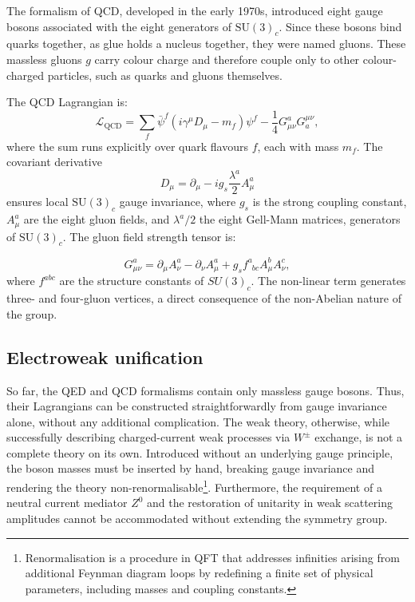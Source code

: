 \vspace{0.5 cm}

The formalism of QCD, developed in the early 1970s, introduced eight gauge bosons associated with the eight generators of $\mathrm{SU}(3)_c$. Since these bosons bind quarks together, as glue holds a nucleus together, they were named gluons. These massless gluons $g$ carry colour charge and therefore couple only to other colour-charged particles, such as quarks and gluons themselves.

The QCD Lagrangian is:
\begin{equation}
    \mathcal{L}_{\text{QCD}} = \sum_{f} \bar{\psi}^f \left( i\gamma^\mu D_\mu - m_f \right) \psi^f
    - \frac{1}{4} G^{a}_{\mu\nu}G^{\mu\nu}_{a},
\end{equation}
where the sum runs explicitly over quark flavours $f$, each with mass $m_f$. The covariant
derivative
\begin{equation}
    D_\mu = \partial_\mu - i g_s \frac{\lambda^a}{2} A^a_\mu
\end{equation}
ensures local $\mathrm{SU}(3)_c$ gauge invariance, where $g_s$ is the strong coupling constant, $A^a_\mu$ are the eight gluon fields, and $\lambda^a/2$ the eight Gell-Mann matrices, generators of $\mathrm{SU}(3)_c$. The gluon field strength tensor is:

\begin{equation}
    G^a_{\mu\nu} = \partial_\mu A^a_\nu - \partial_\nu A^a_\mu
    + g_s f^{a}_{{\,\,\,bc}} A^b_\mu A^c_\nu,
\end{equation}
where $f^{abc}$ are the structure constants of $SU(3)_c$. The non-linear term generates three- and four-gluon vertices, a direct consequence of the non-Abelian nature of the group.


\subsection{Electroweak unification}

So far, the QED and QCD formalisms contain only massless gauge bosons. Thus, their Lagrangians can be constructed straightforwardly from gauge invariance alone, without any additional complication. The weak theory, otherwise, while successfully describing charged-current weak processes via $W^\pm$ exchange, is not a complete theory on its own. Introduced without an underlying gauge principle, the boson masses must be inserted by hand, breaking gauge invariance and rendering the theory non-renormalisable\footnote{Renormalisation is a procedure in QFT that addresses infinities arising from additional Feynman diagram loops by redefining a finite set of physical parameters, including masses and coupling constants.}. Furthermore, the requirement of a neutral current mediator $Z^0$ and the restoration of unitarity in weak scattering amplitudes cannot be accommodated without extending the symmetry group. 

